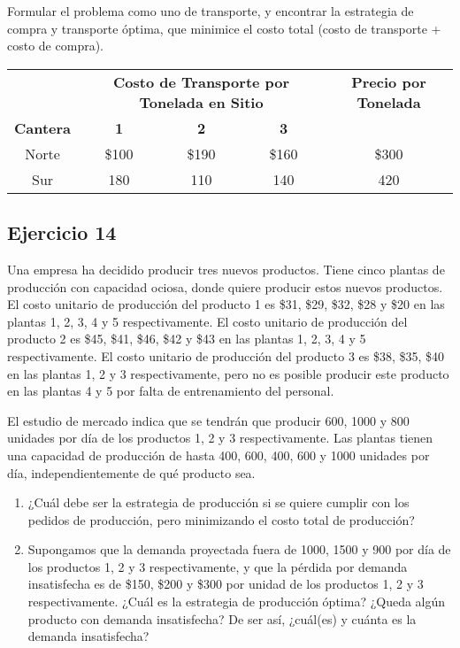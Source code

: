 \documentclass[12pt]{article}
\begin{document}
Formular el problema como uno de transporte, y encontrar la estrategia de compra y transporte óptima, que minimice el costo total (costo de transporte + costo de compra).

\begin{center}
\begin{tabular}{c|ccc|c}
\toprule
& \multicolumn{3}{c|}{\textbf{Costo de Transporte por Tonelada en Sitio}} & \textbf{Precio por Tonelada} \\
\cmidrule(lr){2-4} 
\textbf{Cantera} & \textbf{1} & \textbf{2} & \textbf{3} & \\
\midrule
Norte & \$100 & \$190 & \$160 & \$300 \\
Sur & 180 & 110 & 140 & 420 \\
\bottomrule
\end{tabular}
\end{center}

\subsection{Ejercicio 14}

Una empresa ha decidido producir tres nuevos productos. Tiene cinco plantas de producción con capacidad ociosa, donde quiere producir estos nuevos productos. El costo unitario de producción del producto 1 es \$31, \$29, \$32, \$28 y \$20 en las plantas 1, 2, 3, 4 y 5 respectivamente. El costo unitario de producción del producto 2 es \$45, \$41, \$46, \$42 y \$43 en las plantas 1, 2, 3, 4 y 5 respectivamente. El costo unitario de producción del producto 3 es \$38, \$35, \$40 en las plantas 1, 2 y 3 respectivamente, pero no es posible producir este producto en las plantas 4 y 5 por falta de entrenamiento del personal.

El estudio de mercado indica que se tendrán que producir 600, 1000 y 800 unidades por día de los productos 1, 2 y 3 respectivamente. Las plantas tienen una capacidad de producción de hasta 400, 600, 400, 600 y 1000 unidades por día, independientemente de qué producto sea.

\begin{enumerate}
\item ¿Cuál debe ser la estrategia de producción si se quiere cumplir con los pedidos de producción, pero minimizando el costo total de producción?
\item Supongamos que la demanda proyectada fuera de 1000, 1500 y 900 por día de los productos 1, 2 y 3 respectivamente, y que la pérdida por demanda insatisfecha es de \$150, \$200 y \$300 por unidad de los productos 1, 2 y 3 respectivamente. ¿Cuál es la estrategia de producción óptima? ¿Queda algún producto con demanda insatisfecha? De ser así, ¿cuál(es) y cuánta es la demanda insatisfecha?
\end{enumerate}
\end{document}
